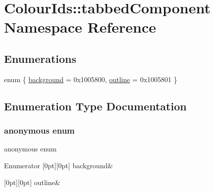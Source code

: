 \hypertarget{namespaceColourIds_1_1tabbedComponent}{}\section{Colour\+Ids\+:\+:tabbed\+Component Namespace Reference}
\label{namespaceColourIds_1_1tabbedComponent}
\subsection*{Enumerations}
\begin{DoxyCompactItemize}
\item 
enum \{ \mbox{\hyperlink{namespaceColourIds_1_1tabbedComponent_a57067d36500955c6754efad6e788662caa96cbd808da9d7a94fddf9c84c766c95}{background}} = 0x1005800, 
\mbox{\hyperlink{namespaceColourIds_1_1tabbedComponent_a57067d36500955c6754efad6e788662ca74a54325f239e0227a48c9bfb38d501c}{outline}} = 0x1005801
 \}
\end{DoxyCompactItemize}


\subsection{Enumeration Type Documentation}
\mbox{\label{namespaceColourIds_1_1tabbedComponent_a57067d36500955c6754efad6e788662c}} 
\subsubsection{\texorpdfstring{anonymous enum}{anonymous enum}}
{\footnotesize\ttfamily anonymous enum}

\begin{DoxyEnumFields}{Enumerator}
[0pt][0pt]{}\mbox{\label{namespaceColourIds_1_1tabbedComponent_a57067d36500955c6754efad6e788662caa96cbd808da9d7a94fddf9c84c766c95}} 
background&\\
\hline

[0pt][0pt]{}\mbox{\label{namespaceColourIds_1_1tabbedComponent_a57067d36500955c6754efad6e788662ca74a54325f239e0227a48c9bfb38d501c}} 
outline&\\
\hline

\end{DoxyEnumFields}
